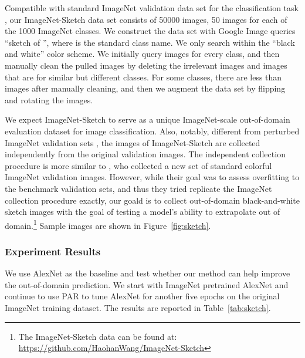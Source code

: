 \documentclass{article}
\begin{document}
Compatible with standard ImageNet validation data set
for the classification task \citep{Deng09imagenet},
our ImageNet-Sketch data set consists of 50000 images, 
50 images for each of the 1000 ImageNet classes. 
We construct the data set with Google Image queries 
``sketch of \underline{\hspace{0.8cm}}'',
where \underline{\hspace{0.8cm}} is the standard class name. 
We only search within the ``black and white'' color scheme.
We initially query  images for every class, 
and then manually clean the pulled images 
by deleting the irrelevant images and images 
that are for similar but different classes. 
For some classes, there are less than  images after manually cleaning, 
and then we augment the data set by flipping and rotating the images. 

We expect ImageNet-Sketch to serve as a unique ImageNet-scale 
out-of-domain evaluation dataset for image classification. 
Also, notably, different from perturbed ImageNet validation sets \citep{geirhos2018imagenettrained,hendrycks2018benchmarking}, 
the images of ImageNet-Sketch are collected independently 
from the original validation images. 
The independent collection procedure is more similar to \citep{recht2019imagenet}, 
who collected a new set of standard colorful ImageNet validation images. 
However, while their goal was to assess overfitting to the benchmark validation sets,
and thus they tried replicate the ImageNet collection procedure exactly,
our goald is to collect out-of-domain black-and-white sketch images 
with the goal of testing a model's ability 
to extrapolate out of domain.\footnote{The ImageNet-Sketch data can be found at: \href{https://github.com/HaohanWang/ImageNet-Sketch}{https://github.com/HaohanWang/ImageNet-Sketch}} 
Sample images are shown in Figure~\ref{fig:sketch}.


\subsubsection{Experiment Results}
We use AlexNet as the baseline and test whether our method 
can help improve the out-of-domain prediction. 
We start with 
ImageNet pretrained AlexNet 
and continue to use PAR to tune AlexNet for another five epochs
on the original ImageNet training dataset. 
The results are reported in Table~\ref{tab:sketch}.
\end{document}
